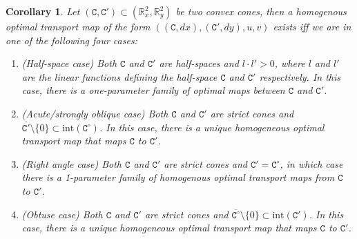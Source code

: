 \documentclass[12pt,reqno]{amsart}
\newtheorem{corr}{Corollary}[section]
\numberwithin{equation}{section}
\begin{document}
        \begin{corr}\label{corr: 2D-tangent-cones}
            Let $(\mathtt C, \mathtt C')\subset (\mathbb R^2_x, \mathbb R^2_y)$ be two convex cones, then a homogenous optimal transport map of the form $((\mathtt C, dx), (\mathtt C', dy), u, v)$ exists iff we are in one of the following four cases:
            \begin{enumerate}
                \item (Half-space case) Both $\mathtt C$ and $\mathtt C'$ are half-spaces and $l\cdot l'
                 >0$, where $l$ and $l'$ are the linear functions defining the half-space $\mathtt C$ and $\mathtt C'$ respectively. In this case, there is a one-parameter family of optimal maps between $\mathtt C$ and $\mathtt C'$. 
                \item (Acute/strongly oblique case) Both $\mathtt C$ and $\mathtt C'$ are strict cones and $\overline{\mathtt C'}\setminus \{0\}\subset \text{int}(\mathtt C^{\circ})$. In this case, there is a unique homogeneous optimal transport map that maps $\mathtt C$ to $\mathtt C'$. 
                \item (Right angle case) Both $\mathtt C$ and $\mathtt C'$ are strict cones and $\mathtt C' = \mathtt C^{\circ}$, in which case there is a 1-parameter family of homogenous optimal transport maps from $\mathtt C$ to $\mathtt C'$. 
                \item (Obtuse case) Both $\mathtt C$ and $\mathtt C'$ are strict cones and $\overline{\mathtt C^{\circ}}\setminus\{0\}\subset \text{int}(\mathtt C')$. In this case, there is a unique homogeneous optimal transport map that maps $\mathtt C$ to $\mathtt C'$. 
            \end{enumerate}
        \end{corr}
\end{document}

